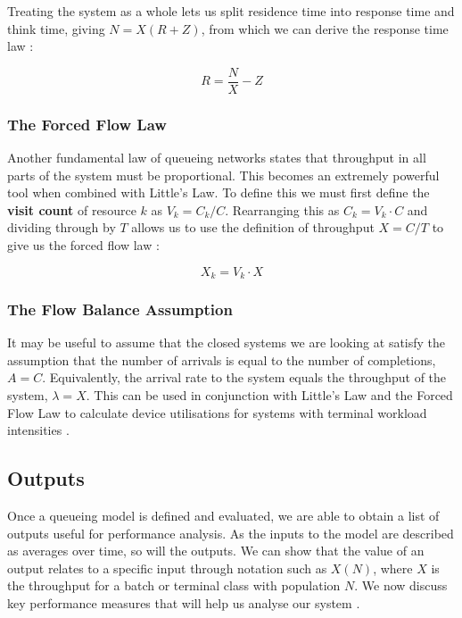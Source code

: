 Treating the system as a whole lets us split residence time into response time and think time, giving $N = X(R + Z)$, from which we can derive the response time law \cite{lazowska84}:

\begin{equation}
R = \frac{N}{X} - Z
\label{eq:response-time-law}
\end{equation}

\subsubsection*{The Forced Flow Law}

Another fundamental law of queueing networks states that throughput in all parts of the system must be proportional. This becomes an extremely powerful tool when combined with Little's Law. To define this we must first define the \textbf{visit count} of resource $k$ as $V_k = C_k/C$. Rearranging this as $C_k = V_k \cdot C$ and dividing through by $T$ allows us to use the definition of throughput $X = C/T$ to give us the forced flow law \cite{lazowska84}:

\begin{equation}
X_k = V_k \cdot X
\label{eq:forced-flow-law}
\end{equation}

\subsubsection*{The Flow Balance Assumption}

It may be useful to assume that the closed systems we are looking at satisfy the assumption that the number of arrivals is equal to the number of completions, $A = C$. Equivalently, the arrival rate to the system equals the throughput of the system, $\lambda = X$. This can be used in conjunction with Little's Law and the Forced Flow Law to calculate device utilisations for systems with terminal workload intensities \cite{lazowska84}.

\subsection{Outputs}
\label{sec:bg-outputs}

Once a queueing model is defined and evaluated, we are able to obtain a list of outputs useful for performance analysis. As the inputs to the model are described as averages over time, so will the outputs. We can show that the value of an output relates to a specific input through notation such as $X(N)$, where $X$ is the throughput for a batch or terminal class with population $N$. We now discuss key performance measures that will help us analyse our system \cite{lazowska84}.

